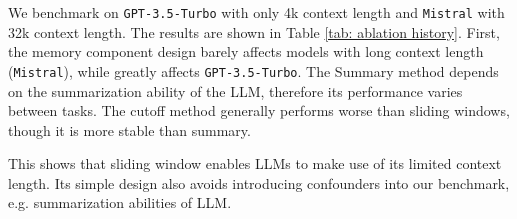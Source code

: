 

We benchmark on \texttt{GPT-3.5-Turbo} with only 4k context length and \texttt{Mistral} with 32k context length. The results are shown in Table \ref{tab: ablation history}. First, the memory component design barely affects models with long context length (\texttt{Mistral}), while greatly affects \texttt{GPT-3.5-Turbo}. The Summary method depends on the summarization ability of the LLM, therefore its performance varies between tasks. The cutoff method generally performs worse than sliding windows, though it is more stable than summary. 

This shows that sliding window enables LLMs to make use of its limited context length. Its simple design also avoids introducing confounders into our benchmark, e.g. summarization abilities of LLM.